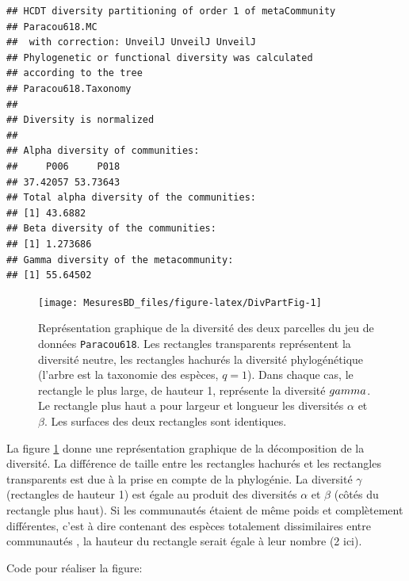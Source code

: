 \documentclass[
  11pt,
  french,
  a4paper,
  extrafontsizes,onecolumn,openright
  ]{memoir}
\newlength{\rf}
\begin{document}
\begin{verbatim}
## HCDT diversity partitioning of order 1 of metaCommunity 
## Paracou618.MC
##  with correction: UnveilJ UnveilJ UnveilJ
## Phylogenetic or functional diversity was calculated
## according to the tree 
## Paracou618.Taxonomy 
## 
## Diversity is normalized 
## 
## Alpha diversity of communities: 
##     P006     P018 
## 37.42057 53.73643 
## Total alpha diversity of the communities: 
## [1] 43.6882
## Beta diversity of the communities: 
## [1] 1.273686
## Gamma diversity of the metacommunity: 
## [1] 55.64502
\end{verbatim}

\normalsize



\scriptsize

\begin{figure}

{\centering \texttt{[image: MesuresBD\_files/figure-latex/DivPartFig-1]} 

}

\caption{Représentation graphique de la diversité des deux parcelles du jeu de données \texttt{Paracou618}. Les rectangles transparents représentent la diversité neutre, les rectangles hachurés la diversité phylogénétique (l'arbre est la taxonomie des espèces, \(q=1\)). Dans chaque cas, le rectangle le plus large, de hauteur 1, représente la diversité \(\\gamma\). Le rectangle plus haut a pour largeur et longueur les diversités \(\alpha\) et \(\beta\). Les surfaces des deux rectangles sont identiques.}\label{fig:DivPartFig}
\end{figure}

\normalsize

La figure \ref{fig:DivPartFig} donne une représentation graphique de la décomposition de la diversité.
La différence de taille entre les rectangles hachurés et les rectangles transparents est due à la prise en compte de la phylogénie.
La diversité \(\gamma\) (rectangles de hauteur 1) est égale au produit des diversités \(\alpha\) et \(\beta\) (côtés du rectangle plus haut).
Si les communautés étaient de même poids et complètement différentes, c'est à dire contenant des espèces totalement dissimilaires entre communautés \autocite{Pavoine2015a}, la hauteur du rectangle serait égale à leur nombre (2 ici).

Code pour réaliser la figure:

\scriptsize
\end{document}

